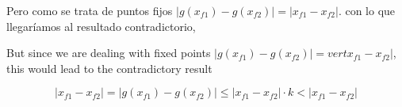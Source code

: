 \begin{paracol}{2}

Pero como se trata de puntos fijos $\vert g(x_{f1})-g(x_{f2}) \vert =\vert x_{f1}-x_{f2}\vert $. con lo que llegaríamos al resultado contradictorio, 

\switchcolumn

But since we are dealing with fixed points $\vert g(x_{f1})-g(x_{f2}) \vert =vert x_{f1}-x_{f2} \vert$, this would lead to the contradictory result

\end{paracol}

 \begin{equation*}
\vert x_{f1}-x_{f2}\vert=\vert g(x_{f1})-g(x_{f2}) \vert  \leq \vert x_{f1}-x_{f2} \vert\cdot k < \vert x_{f1}-x_{f2} \vert 
\end{equation*}

